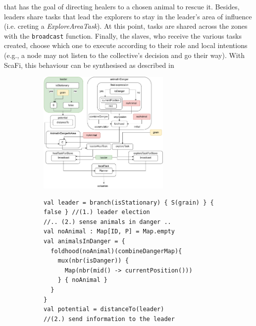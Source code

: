  that has the goal of directing healers to a chosen animal to 
 rescue it. Besides, leaders share tasks that lead the explorers 
 to stay in the leader's area of influence (i.e. creting a \emph{ExploreAreaTask}).
%
At this point, tasks are shared across 
 the zones with the \lstinline|broadcast| function.
%
Finally, the slaves, who receive the various tasks created,
 choose which one to execute according to their role and 
 local intentions (e.g., a node may not listen to 
 the collective's decision and go their way).
%
With ScaFi, this behaviour can be synthesised as described in 
%
\begin{figure}[t!]
\centering
\begin{subfigure}[b]{\textwidth}
\centering
\includegraphics[width=0.7\textwidth]{papers/mdpi2020/imgs/wildlife-program-diagram.pdf}
\caption{\label{fig:eval:diagram}}
\end{subfigure}
\par\bigskip %
\begin{subfigure}[b]{\textwidth}
\centering
\begin{lstlisting}
val leader = branch(isStationary) { S(grain) } { false } //(1.) leader election
//.. (2.) sense animals in danger ..
val noAnimal : Map[ID, P] = Map.empty
val animalsInDanger = {
  foldhood(noAnimal)(combineDangerMap){
    mux(nbr(isDanger)) {
      Map(nbr(mid() -> currentPosition()))
    } { noAnimal }
  }
}
val potential = distanceTo(leader)
//(2.) send information to the leader

\end{lstlisting}
\end{subfigure}
\end{figure}
